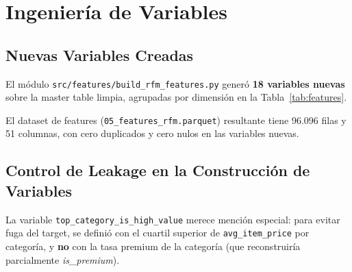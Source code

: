 \documentclass[journal,letterpaper]{IEEEtran}
\begin{document}
\section{Ingeniería de Variables}
\subsection{Nuevas Variables Creadas}
El módulo \texttt{src/features/build\_rfm\_features.py} generó \textbf{18 variables nuevas} sobre la master table limpia, agrupadas por dimensión en la Tabla~\ref{tab:features}.

\begin{table}[h]
\centering
\caption{Variables Nuevas Creadas en el Sprint 2}
\label{tab:features}
\end{table}

El dataset de features (\texttt{05\_features\_rfm.parquet}) resultante tiene 96.096 filas y 51 columnas, con cero duplicados y cero nulos en las variables nuevas.

\subsection{Control de Leakage en la Construcción de Variables}
La variable \texttt{top\_category\_is\_high\_value} merece mención especial: para evitar fuga del target, se definió con el cuartil superior de \texttt{avg\_item\_price} por categoría, y \textbf{no} con la tasa premium de la categoría (que reconstruiría parcialmente \textit{is\_premium}).
\end{document}
